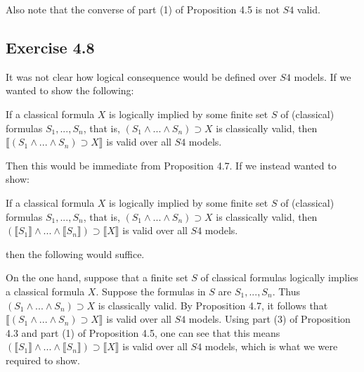 \documentclass{article}
\newcommand{\lbc}{\llbracket}
\newcommand{\rbc}{\rrbracket}
\theoremstyle{definition}
\begin{document}
Also note that the converse of part (1) of Proposition 4.5 is not $S4$ valid.

\subsection*{Exercise 4.8}
It was not clear how logical consequence would be defined over $S4$ models. If we wanted to show the following:

If a classical formula $X$ is logically implied by some finite set $S$ of (classical) formulas $S_1,...,S_n$, that is, 
$(S_1\wedge...\wedge S_n)\supset X$ is classically valid, then $\lbc (S_1\wedge...\wedge S_n)\supset X\rbc$ is valid over 
all $S4$ models.

Then this would be immediate from Proposition 4.7. If we instead wanted to show:

If a classical formula $X$ is logically implied by some finite set $S$ of (classical) formulas $S_1,...,S_n$, that is,
$(S_1\wedge...\wedge S_n)\supset X$ is classically valid, then $(\lbc S_1\rbc\wedge...\wedge\lbc S_n\rbc)\supset\lbc X\rbc$ is valid
over all $S4$ models.

then the following would suffice.

On the one hand, suppose that a finite set $S$ of classical formulas logically implies a classical formula $X$. Suppose the 
formulas in $S$ are $S_1,...,S_n$. Thus $(S_1\wedge...\wedge S_n)\supset X$ is classically valid. By Proposition 4.7, it follows that 
$\lbc(S_1\wedge...\wedge S_n)\supset X\rbc$ is valid over all $S4$ models. Using part (3) of Proposition 4.3 and part (1) of Proposition 4.5, 
one can see that this means 
$(\lbc S_1\rbc\wedge...\wedge\lbc S_n\rbc)\supset\lbc X\rbc$ is valid over all $S4$ models, which is what we were required to show.
\end{document}
